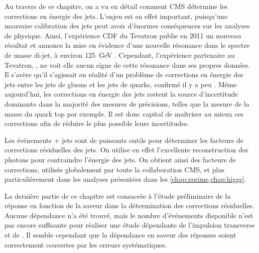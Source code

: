 Au travers de ce chapitre, on a vu en détail comment CMS détermine les corrections en énergie des jets. L'enjeu est en effet important, puisqu'une mauvaise calibration des jets peut avoir d'énormes conséquences sur les analyses de physique. Ainsi, l'expérience CDF du Tevatron publie en 2011 un nouveau résultat et annonce la mise en évidence d'une nouvelle résonance dans le spectre de masse di-jet, à environ \SI{125}{\GeV} \citep{CDF_old}. Cependant, l'expérience partenaire au Tevatron, \dzero, ne voit elle aucun signe de cette résonance dans ses propres données. Il s'avère qu'il s'agissait en réalité d'un problème de corrections en énergie des jets entre les jets de gluons et les jets de quarks, confirmé il y a peu \citep{CDF_new}. Même aujourd'hui, les corrections en énergie des jets restent la source d'incertitude dominante dans la majorité des mesures de précisions, telles que la mesure de la masse du quark top par exemple. Il est donc capital de maîtriser au mieux ces corrections afin de réduire le plus possible leurs incertitudes.

\bigskip

Les événements \Pphoton + jets sont de puissants outils pour déterminer les facteurs de corrections résiduelles des jets. On utilise en effet l'excellente reconstruction des photons pour contraindre l'énergie des jets. On obtient ainsi des facteurs de corrections, utilisés globalement par toute la collaboration CMS, et plus particulièrement dans les analyses présentées dans les \cref{chap:zprime,chap:higgs}.

\bigskip

La dernière partie de ce chapitre est consacrée à l'étude préliminaire de la réponse en fonction de la saveur dans la détermination des corrections résiduelles. Aucune dépendance n'a été trouvé, mais le nombre d'événements disponible n'est pas encore suffisante pour réaliser une étude dépendante de l'impulsion transverse et de \aeta. Il semble cependant que la dépendance en saveur des réponses soient correctement couvertes par les erreurs systématiques.
